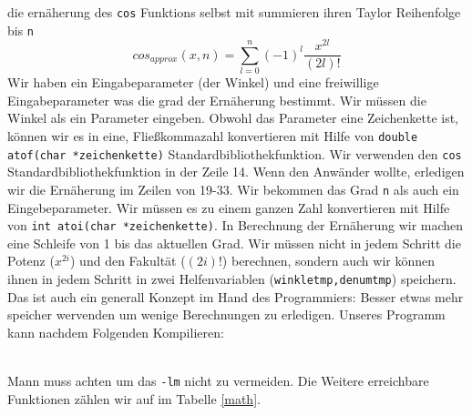 die ernäherung des \texttt{cos} Funktions selbst mit summieren ihren Taylor Reihenfolge
bis \texttt{n}
\begin{equation}
cos_{approx}\left(x,n\right)=\sum_{l=0}^{n} \left(-1\right)^{l} \dfrac{x^{2l}}{\left(2l\right)!}
\end{equation}
Wir haben ein Eingabeparameter (der Winkel) und eine freiwillige Eingabeparameter
was die grad der Ernäherung bestimmt. Wir müssen die Winkel als ein Parameter eingeben.
Obwohl das Parameter eine Zeichenkette ist, können wir es in eine, Fließkommazahl konvertieren
mit Hilfe von \texttt{double atof(char *zeichenkette)} Standardbibliothekfunktion. 
Wir verwenden den \texttt{cos} Standardbibliothekfunktion in der Zeile 14. Wenn
den Anwänder wollte, erledigen wir die Ernäherung im Zeilen von 19-33. Wir bekommen 
das Grad \texttt{n} als auch ein Eingebeparameter. Wir müssen es zu einem ganzen 
Zahl konvertieren mit Hilfe von \texttt{int atoi(char *zeichenkette)}. In Berechnung der Ernäherung wir machen 
eine Schleife von 1 bis das aktuellen Grad. Wir müssen nicht in jedem Schritt die 
Potenz ($x^{2i}$) und den Fakultät ($(2i)!$) berechnen, sondern auch wir können 
ihnen in jedem Schritt in zwei Helfenvariablen (\texttt{winkletmp,denumtmp}) speichern.
Das ist auch ein generall Konzept im Hand des Programmiers: Besser etwas mehr speicher
wervenden um wenige Berechnungen zu erledigen. 
Unseres Programm kann nachdem Folgenden Kompilieren:\\
\\
Mann muss achten um das \texttt{-lm} nicht zu vermeiden.
Die Weitere erreichbare  Funktionen zählen wir auf im Tabelle \ref{math}. 
